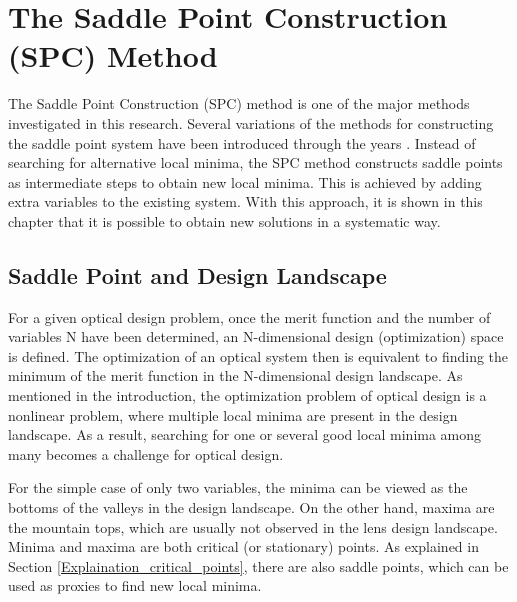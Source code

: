 \chapter{The Saddle Point Construction (SPC) Method}
\label{chapter_SPC_method_reccomendation}
\graphicspath{ {./chapter-sp/figures/} }
\captionsetup[figure]{labelfont=bf}
\captionsetup{margin=1.5em}
\captionsetup[table]{labelfont=bf}





\noindent 
The Saddle Point Construction (SPC) method is one of the major methods investigated in this research. Several variations of the methods for constructing the saddle point system have been introduced through the years \cite{BociortSPCSexplained}\cite{MVTurnhoutSPC15}\cite{HouProc2015}. Instead of searching for alternative local minima, the SPC method constructs saddle points as intermediate steps to obtain new local minima. This is achieved by adding extra variables to the existing system. With this approach, it is shown in this chapter that it is possible to obtain new solutions in a systematic way. 

\section{Saddle Point and Design Landscape}
For a given optical design problem, once the merit function and the number of variables N have been determined, an N-dimensional design (optimization) space is defined. The optimization of an optical system then is equivalent to finding the minimum of the merit function in the N-dimensional design landscape. As mentioned in the introduction, the optimization problem of optical design is a nonlinear problem, where multiple local minima are present in the design landscape. As a result, searching for one or several good local minima among many becomes a challenge for optical design. 

For the simple case of only two variables, the minima can be viewed as the bottoms of the valleys in the design landscape. On the other hand, maxima are the mountain tops, which are usually not observed in the lens design landscape. Minima and maxima are both critical (or stationary) points. As explained in Section \ref{Explaination_critical_points}, there are also saddle points, which can be used as proxies to find new local minima.

